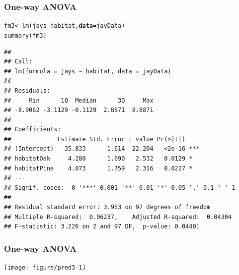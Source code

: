 \documentclass[color=usenames,dvipsnames]{beamer}\usepackage[]{graphicx}\usepackage[]{color}
\makeatletter
\newcommand{\hlopt}[1]{\textcolor[rgb]{0,0,0}{#1}}%
\newcommand{\hlstd}[1]{\textcolor[rgb]{0,0,0}{#1}}%
\newcommand{\hlkwb}[1]{\textcolor[rgb]{0,0.341,0.682}{#1}}%
\newcommand{\hlkwc}[1]{\textcolor[rgb]{0,0,0}{\textbf{#1}}}%
\newcommand{\hlkwd}[1]{\textcolor[rgb]{0.004,0.004,0.506}{#1}}%
\newenvironment{kframe}{%
 \def\at@end@of@kframe{}%
 \ifinner\ifhmode%
  \def\at@end@of@kframe{\end{minipage}}%
  \begin{minipage}{\columnwidth}%
 \fi\fi%
 \def\FrameCommand##1{\hskip\@totalleftmargin \hskip-\fboxsep
 \colorbox{shadecolor}{##1}\hskip-\fboxsep
     \hskip-\linewidth \hskip-\@totalleftmargin \hskip\columnwidth}%
 \MakeFramed {\advance\hsize-\width
   \@totalleftmargin\z@ \linewidth\hsize
   \@setminipage}}%
 {\par\unskip\endMakeFramed%
 \at@end@of@kframe}
\newenvironment{knitrout}{}{} %
\makeatother
\begin{document}
\begin{frame}[fragile]
  \frametitle{One-way ANOVA}
\begin{knitrout}\scriptsize
{}\color{fgcolor}\begin{kframe}
\begin{alltt}
\hlstd{fm3} \hlkwb{<-} \hlkwd{lm}\hlstd{(jays} \hlopt{~} \hlstd{habitat,} \hlkwc{data}\hlstd{=jayData)}
\hlkwd{summary}\hlstd{(fm3)}
\end{alltt}
\begin{verbatim}
## 
## Call:
## lm(formula = jays ~ habitat, data = jayData)
## 
## Residuals:
##     Min      1Q  Median      3Q     Max 
## -8.9062 -3.1129 -0.1129  2.8871  8.8871 
## 
## Coefficients:
##             Estimate Std. Error t value Pr(>|t|)    
## (Intercept)   35.833      1.614  22.204   <2e-16 ***
## habitatOak     4.280      1.690   2.532   0.0129 *  
## habitatPine    4.073      1.759   2.316   0.0227 *  
## ---
## Signif. codes:  0 '***' 0.001 '**' 0.01 '*' 0.05 '.' 0.1 ' ' 1
## 
## Residual standard error: 3.953 on 97 degrees of freedom
## Multiple R-squared:  0.06237,	Adjusted R-squared:  0.04304 
## F-statistic: 3.226 on 2 and 97 DF,  p-value: 0.04401
\end{verbatim}
\end{kframe}
\end{knitrout}
\end{frame}




\begin{frame}[fragile]
  \frametitle{One-way ANOVA}

\centering
\texttt{[image: figure/pred3-1]} \\
\end{frame}
\end{document}
